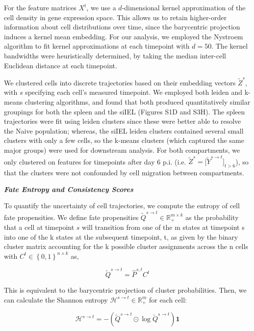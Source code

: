 For the feature matrices \(X^{t}\), we use a \(d\)-dimensional kernel
approximation of the cell density in gene expression space. This allows
us to retain higher-order information about cell distributions over
time, since the barycentric projection induces a kernel mean embedding.
For our analysis, we employed the Nystroem algorithm to fit kernel
approximations at each timepoint with \(d = 50\). The kernel bandwidths
were heuristically determined, by taking the median inter-cell Euclidean
distance at each timepoint.

We clustered cells into discrete trajectories based on their embedding
vectors \({\widetilde{Z}}^{s}\), with \(s\) specifying each cell's
measured timepoint. We employed both leiden and k-means clustering
algorithms, and found that both produced quantitatively similar
groupings for both the spleen and the siIEL (Figures S1D and S3H). The
spleen trajectories were fit using leiden clusters since these were
better able to resolve the Naive population; whereas, the siIEL leiden
clusters contained several small clusters with only a few cells, so the
k-means clusters (which captured the same major groups) were used for
downstream analysis. For both compartments, we only clustered on
features for timepoints after day 6 p.i. (i.e.
\({\widetilde{Z}}^{s} = \lbrack{\widetilde{Y}}^{s \rightarrow t}\rbrack_{t > 6}\)),
so that the clusters were not confounded by cell migration between
compartments.

\emph{\textbf{Fate Entropy and Consistency Scores}}

To quantify the uncertainty of cell trajectories, we compute the entropy
of cell fate propensities. We define fate propensities
\({\widetilde{Q}}^{s \rightarrow t} \in \mathbb{R}_{+}^{m \times k}\) as
the probability that a cell at timepoint \(s\) will transition from one
of the m states at timepoint s into one of the k states at the
subsequent timepoint, t, as given by the binary cluster matrix
accounting for the k possible cluster assignments across the n cells
with \(C^{t} \in \left\{ 0,1 \right\}^{n \times k}\) as,

\[{\widetilde{Q}}^{s \rightarrow t} = {\widehat{P}}^{s,t}C^{t}\]

This is equivalent to the barycentric projection of cluster
probabilities. Then, we can calculate the Shannon entropy
\(\mathcal{H}^{s \rightarrow t} \in \mathbb{R}_{+}^{m}\) for each cell:

\[\mathcal{H}^{s \rightarrow t} = - \left( {\widetilde{Q}}^{s \rightarrow t} \odot \mathrm{\log}{\widetilde{Q}}^{s \rightarrow t} \right)\mathbf{1}\]

